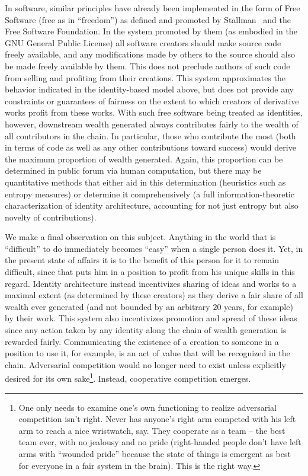 \documentclass[pra,twocolumn,groupedaddress,10pt]{revtex4}
\theoremstyle{definition}
\begin{document}
In software, similar principles have already been implemented in the form of Free Software (free as in ``freedom'') as defined and promoted by Stallman~\cite{fsf} and the Free Software Foundation. In the system promoted by them (as embodied in the GNU General Public License) all software creators should make source code freely available, and any modifications made by others to the source should also be made freely available by them. This does not preclude authors of such code from selling and profiting from their creations. This system approximates the behavior indicated in the identity-based model above, but does not provide any constraints or guarantees of fairness on the extent to which creators of derivative works profit from these works. With such free software being treated as identities, however, downstream wealth generated always contributes fairly to the wealth of all contributors in the chain. In particular, those who contribute the most (both in terms of code as well as any other contributions toward success) would derive the maximum proportion of wealth generated. Again, this proportion can be determined in public forum via human computation, but there may be quantitative methods that either aid in this determination (heuristics such as entropy measures) or determine it comprehensively (a full information-theoretic characterization of identity architecture, accounting for not just entropy but also novelty of contributions).

We make a final observation on this subject. Anything in the world that is ``difficult'' to do immediately becomes ``easy'' when a single person does it. Yet, in the present state of affairs it is to the benefit of this person for it to remain difficult, since that puts him in a position to profit from his unique skills in this regard. Identity architecture instead incentivizes sharing of ideas and works to a maximal extent (as determined by these creators) as they derive a fair share of all wealth ever generated (and not bounded by an arbitrary $20$ years, for example) by their work. This system also incentivizes promotion and spread of these ideas since any action taken by any identity along the chain of wealth generation is rewarded fairly. Communicating the existence of a creation to someone in a position to use it, for example, is an act of value that will be recognized in the chain. Adversarial competition would no longer need to exist unless explicitly desired for its own sake\footnote{One only needs to examine one's own functioning to realize adversarial competition isn't right. Never has anyone's right arm competed with his left arm to reach a nice wristwatch, say. They cooperate as a team -- the best team ever, with no jealousy and no pride (right-handed people don't have left arms with ``wounded pride'' because the state of things is emergent as best for everyone in a fair system in the brain). This is the right way.}. Instead, cooperative competition emerges.
\end{document}
